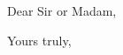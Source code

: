 \documentclass[11pt,a4paper,sans]{moderncv}        %
\begin{document}
	\clearpage
	\opening{Dear Sir or Madam,}
	\closing{Yours truly,}
	\makelettertitle
	

	
	
	

\end{document}
